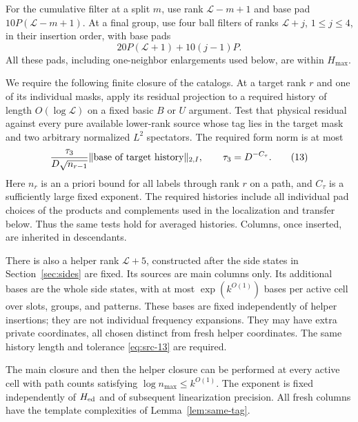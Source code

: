 For the cumulative filter at a split $m$, use rank
$\mathcal L-m+1$ and base pad $10P(\mathcal L-m+1)$.  At a final group,
use four ball filters of ranks $\mathcal L+j$, $1\le j\le4$, in their
insertion order, with base pads
\[
 20P(\mathcal L+1)+10(j-1)P.
\]
All these pads, including one-neighbor enlargements used below, are
within $H_{\max}$.

We require the following finite closure of the catalogs.  At a target
rank $r$ and one of its individual masks, apply its residual projection
to a required history of length $O(\log\mathcal L)$ on a fixed basic
$B$ or $U$ argument.  Test that physical residual against every pure
available lower-rank source whose tag lies in the target mask and two
arbitrary normalized $L^2$ spectators.  The required form norm is at
most
\begin{equation*}
 \frac{\tau_3}{D\sqrt{n_{r-1}}}
        \lVert \text{base of target history}\rVert_{2,I},
 \qquad \tau_3=D^{-C_\tau}.
 \tag{13}\label{eq:src-13}
\end{equation*}
Here $n_r$ is an a priori bound for all labels through rank $r$ on a
path, and $C_\tau$ is a sufficiently large fixed exponent.  The required
histories include all individual pad choices of the products and
complements used in the localization and transfer below.  Thus the
same tests hold for averaged histories.  Columns, once inserted, are
inherited in descendants.

There is also a helper rank $\mathcal L+5$, constructed after the side
states in Section~\ref{sec:sides} are fixed.  Its sources are main
columns only.  Its additional bases are the whole side states, with
at most $\exp(k^{O(1)})$ bases per active cell over slots, groups, and
patterns.  These bases are fixed independently of helper insertions;
they are not individual frequency expansions.  They may have extra
private coordinates, all chosen distinct from fresh helper coordinates.
The same history length and tolerance \eqref{eq:src-13} are required.

\begin{lemma}
\label{lem:catalog-closure}
The main closure and then the helper closure can be performed at every
active cell with path counts satisfying
$\log n_{\max}\le k^{O(1)}$.  The exponent is fixed independently of
$H_{\rm ed}$ and of subsequent linearization precision.  All fresh
columns have the template complexities of Lemma~\ref{lem:same-tag}.
\end{lemma}

